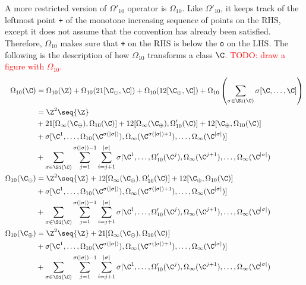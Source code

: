 A more restricted version of $\Omega'_{10}$ operator is $\Omega_{10}$. Like $\Omega'_{10}$, it keeps track of the leftmost point \texttt{+} of the monotone increasing sequence of points on the RHS, except it does not assume that the convention has already been satisfied. Therefore, $\Omega_{10}$ makes sure that \texttt{+} on the RHS is below the \texttt{o} on the LHS. The following is the description of how $\Omega_{10}$ transforms a class $\C$.
\textcolor{red}{TODO: draw a figure with $\Omega_{10}$.} 
\begin{align*}
  \Omega_{10}(\C)   &= \Omega_{10}(\Z) + \Omega_{10}(21[\C_\ominus,\C]) + \Omega_{10}(12[\C_\oplus, \C]) + \Omega_{10}\left(\sum_{\sigma \in \Si(\C)}\sigma[\C,\ldots,\C]\right)\\
                    &= \Z^2\seq{\Z}\\
                    &+ 21[\Omega_\infty(\C_\ominus), \Omega_{10}(\C)] + 12[\Omega_\infty(\C_\oplus), \Omega'_{10}(\C)] + 12[\C_\oplus, \Omega_{10}(\C)]\\
                    &+ \sigma[\C^{1},\ldots,\Omega_{10}(\C^{\sigma(|\sigma|)}),\Omega_\infty(\C^{\sigma(|\sigma|)+1}),\ldots,\Omega_\infty(\C^{|\sigma|})]\\
                     &+ \sum_{\sigma \in \Si(\C)}\sum_{j=1}^{\sigma(|\sigma|)-1}\sum_{i=j+1}^{|\sigma|}\sigma\vert{\C^{1},\ldots,\Omega'_{10}(\C^j),\Omega_\infty(\C^{j+1}),\ldots,\Omega_\infty(\C^{|\sigma|})}\\
  \Omega_{10}(\C_\ominus) &= \Z^2\seq{\Z} + 12[\Omega_\infty(\C_\oplus), \Omega'_{10}(\C)] + 12[\C_\oplus, \Omega_{10}(\C)]\\
                    &+ \sigma[\C^{1},\ldots,\Omega_{10}(\C^{\sigma(|\sigma|)}),\Omega_\infty(\C^{\sigma(|\sigma|)+1}),\ldots,\Omega_\infty(\C^{|\sigma|})]\\
                     &+ \sum_{\sigma \in \Si(\C)}\sum_{j=1}^{\sigma(|\sigma|)-1}\sum_{i=j+1}^{|\sigma|}\sigma\vert{\C^{1},\ldots,\Omega'_{10}(\C^j),\Omega_\infty(\C^{j+1}),\ldots,\Omega_\infty(\C^{|\sigma|})}\\
  \Omega_{10}(\C_\oplus) &= \Z^2\seq{\Z} + 21[\Omega_\infty(\C_\ominus), \Omega_{10}(\C)]\\
                    &+ \sigma[\C^{1},\ldots,\Omega_{10}(\C^{\sigma(|\sigma|)}),\Omega_\infty(\C^{\sigma(|\sigma|)+1}),\ldots,\Omega_\infty(\C^{|\sigma|})]\\
                     &+ \sum_{\sigma \in \Si(\C)}\sum_{j=1}^{\sigma(|\sigma|)-1}\sum_{i=j+1}^{|\sigma|}\sigma\vert{\C^{1},\ldots,\Omega'_{10}(\C^j),\Omega_\infty(\C^{j+1}),\ldots,\Omega_\infty(\C^{|\sigma|})}\\
\end{align*}

